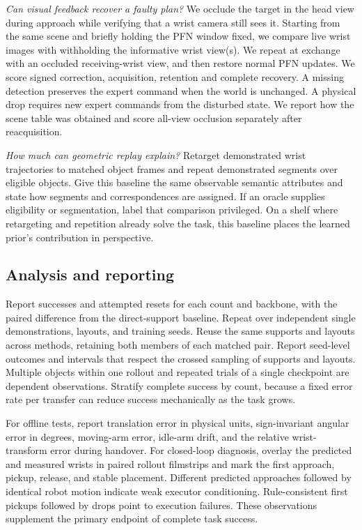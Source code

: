\documentclass[letterpaper,10pt,conference]{ieeeconf}
\begin{document}
\textit{Can visual feedback recover a faulty plan?}
We occlude the target in the head view during approach while verifying that a wrist camera still sees it. Starting from the same scene and briefly holding the PFN window fixed, we compare live wrist images with withholding the informative wrist view(s). We repeat at exchange with an occluded receiving-wrist view, and then restore normal PFN updates. We score signed correction, acquisition, retention and complete recovery. A missing detection preserves the expert command when the world is unchanged. A physical drop requires new expert commands from the disturbed state. We report how the scene table was obtained and score all-view occlusion separately after reacquisition.

\textit{How much can geometric replay explain?}
Retarget demonstrated wrist trajectories to matched object frames and repeat demonstrated segments over eligible objects. Give this baseline the same observable semantic attributes and state how segments and correspondences are assigned. If an oracle supplies eligibility or segmentation, label that comparison privileged. On a shelf where retargeting and repetition already solve the task, this baseline places the learned prior's contribution in perspective.

\subsection{Analysis and reporting}
Report successes and attempted resets for each count and backbone, with the paired difference from the direct-support baseline. Repeat over independent single demonstrations, layouts, and training seeds. Reuse the same supports and layouts across methods, retaining both members of each matched pair. Report seed-level outcomes and intervals that respect the crossed sampling of supports and layouts. Multiple objects within one rollout and repeated trials of a single checkpoint are dependent observations. Stratify complete success by count, because a fixed error rate per transfer can reduce success mechanically as the task grows.

For offline tests, report translation error in physical units, sign-invariant angular error in degrees, moving-arm error, idle-arm drift, and the relative wrist-transform error during handover. For closed-loop diagnosis, overlay the predicted and measured wrists in paired rollout filmstrips and mark the first approach, pickup, release, and stable placement. Different predicted approaches followed by identical robot motion indicate weak executor conditioning. Rule-consistent first pickups followed by drops point to execution failures. These observations supplement the primary endpoint of complete task success.
\end{document}
